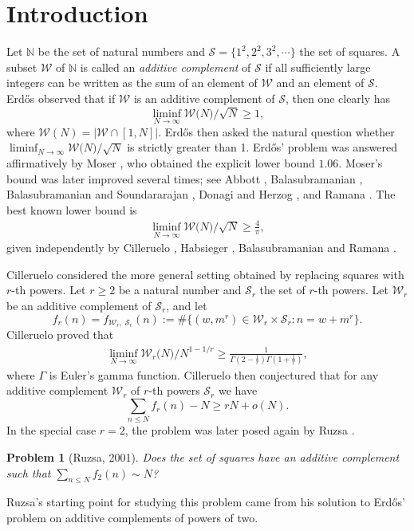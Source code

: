 \documentclass[12pt,a4paper,reqno]{amsart}
\numberwithin{equation}{section}
\theoremstyle{plain}
\newtheorem{problem}{Problem}
\theoremstyle{definition}
\begin{document}
\section{Introduction}
Let $\mathbb{N}$ be the set of natural numbers and $\mathcal{S}=\big\{1^2, 2^2, 3^2,\cdots\big\}$ the set of squares. A subset $\mathcal{W}$ of $\mathbb{N}$ is called an {\it additive complement} of $\mathcal{S}$ if all sufficiently large integers can be written as the sum of an element of $\mathcal{W}$ and an element of $\mathcal{S}$. Erd\H os \cite{Erdos} observed that if $\mathcal{W}$ is an additive complement of $\mathcal{S}$, then one clearly has
$$
\liminf_{N\rightarrow\infty}\mathcal{W}\big(N\big)/\sqrt{N}\ge 1,
$$ 
where $\mathcal{W}(N)=\big|\mathcal{W}\cap[1,N]\big|$.
Erd\H os \cite{Erdos} then asked the natural question whether 
$
\liminf_{N\rightarrow\infty}\mathcal{W}\big(N\big)/\sqrt{N}
$ 
is strictly greater than 1. Erd\H os' problem was answered affirmatively by Moser \cite{Moser}, who obtained the explicit lower bound $1.06$. Moser's bound was later improved several times; see Abbott \cite{Abbott}, Balasubramanian \cite{Balasubramanian}, Balasubramanian and Soundararajan \cite{Balasubramanian-2}, Donagi and Herzog \cite{Donagi}, and Ramana \cite{Ramana,Ramana-2}. The best known lower bound is 
\begin{align}\label{eq-1216-1}
\liminf_{N\rightarrow\infty}\mathcal{W}\big(N\big)/\sqrt{N}\ge \frac{4}{\pi}, 
\end{align}
given independently by Cilleruelo \cite{Cilleruelo}, Habsieger \cite{Habsieger}, Balasubramanian and Ramana \cite{B-Rama}. 

Cilleruelo \cite{Cilleruelo} considered the more general setting obtained by replacing squares with $r$-th powers. Let $r\ge 2$ be a natural number and $\mathcal{S}_r$ the set of $r$-th powers. Let $\mathcal{W}_r$ be an additive complement of $\mathcal{S}_r$, and let
$$
f_r(n)=f_{\mathcal{W}_r,\ \mathcal{S}_r}(n):=\#\big\{(w,m^r)\in \mathcal{W}_r\times \mathcal{S}_r: n=w+m^r\big\}.
$$
Cilleruelo proved that
\begin{align}\label{new-gamma-2}
\liminf_{N\rightarrow\infty}\mathcal{W}_r\big(N\big)/N^{1-1/r}\ge \frac{1}{\Gamma\left(2-\frac{1}{r}\right)\Gamma\left(1+\frac{1}{r}\right)}, 
\end{align}
where $\Gamma$ is Euler's gamma function.
Cilleruelo then conjectured that for any additive complement $\mathcal{W}_r$ of $r$-th powers $\mathcal{S}_r$ we have
$$
\sum_{n\le N}f_r(n)-N\ge rN+o(N).
$$
In the special case $r=2$, the problem was later posed again by Ruzsa \cite{Ruzsa2}. 
\begin{problem}[Ruzsa, 2001]\label{pro:2}
Does the set of squares have an additive complement such that
$\sum_{n\le N}f_2(n)\sim N$?
\end{problem}
Ruzsa's starting point for studying this problem came from his solution \cite{Ruzsa} to Erd\H os' problem \cite{Erdos2} on additive complements of powers of two.
\end{document}
